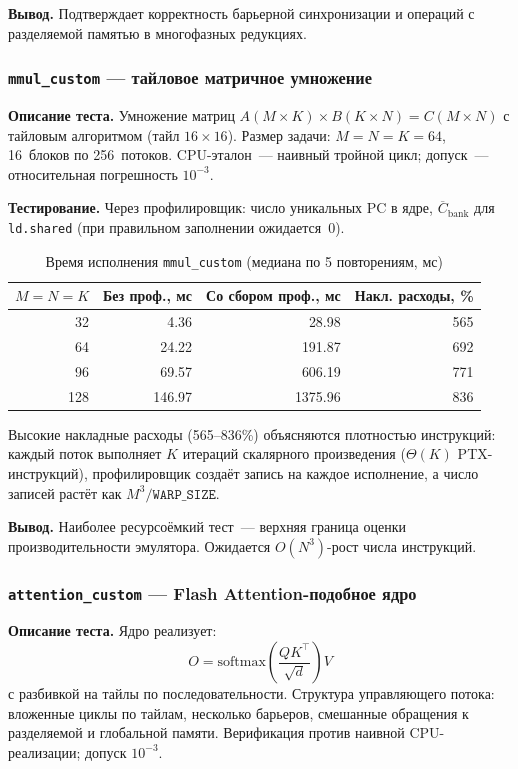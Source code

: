 \textbf{Вывод.}
Подтверждает корректность барьерной синхронизации и операций
с разделяемой памятью в многофазных редукциях.

\subsubsection{\texttt{mmul\_custom} --- тайловое матричное умножение}

\textbf{Описание теста.}
Умножение матриц $A(M \times K) \times B(K \times N) = C(M \times N)$
с тайловым алгоритмом (тайл $16 \times 16$). Размер задачи:
$M = N = K = 64$, 16~блоков по 256~потоков. CPU-эталон~---
наивный тройной цикл; допуск~--- относительная погрешность $10^{-3}$.

\textbf{Тестирование.}
Через профилировщик: число уникальных PC в ядре,
$\overline{C}_{\mathrm{bank}}$ для \texttt{ld.shared}
(при правильном заполнении ожидается~0).

\begin{table}[h]
  \caption{Время исполнения \texttt{mmul\_custom} (медиана по 5 повторениям, мс)}
  \label{tab:mmul_perf}
  \centering
  \begin{tabular}{rrrr}
    \toprule
    $M = N = K$ & Без проф., мс & Со сбором проф., мс & Накл. расходы, \% \\
    \midrule
    32  & 4.36   & 28.98   & 565 \\
    64  & 24.22  & 191.87  & 692 \\
    96  & 69.57  & 606.19  & 771 \\
    128 & 146.97 & 1375.96 & 836 \\
    \bottomrule
  \end{tabular}
\end{table}

Высокие накладные расходы (565--836\%) объясняются плотностью инструкций:
каждый поток выполняет $K$ итераций скалярного произведения ($\Theta(K)$
PTX-инструкций), профилировщик создаёт запись на каждое исполнение,
а число записей растёт как $M^3/\texttt{WARP\_SIZE}$.

\textbf{Вывод.}
Наиболее ресурсоёмкий тест~--- верхняя граница оценки
производительности эмулятора. Ожидается $O(N^3)$-рост числа инструкций.

\subsubsection{\texttt{attention\_custom} --- Flash Attention-подобное ядро}

\textbf{Описание теста.}
Ядро реализует:
\[
  O = \mathrm{softmax}\!\left(\frac{Q K^\top}{\sqrt{d}}\right) V
\]
с разбивкой на тайлы по последовательности. Структура управляющего
потока: вложенные циклы по тайлам, несколько барьеров, смешанные
обращения к разделяемой и глобальной памяти.
Верификация против наивной CPU-реализации; допуск $10^{-3}$.

